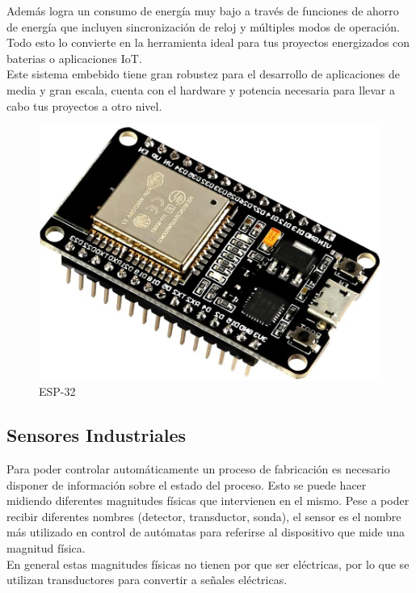 \documentclass[12pt,titlepage]{article}
\begin{document}
Además  logra un consumo de energía muy bajo a través de funciones de ahorro de energía que incluyen sincronización de reloj y múltiples modos de operación. Todo esto lo convierte en la herramienta ideal para tus proyectos energizados con baterias o aplicaciones IoT. \\[0.8em]

Este sistema embebido tiene gran robustez para el desarrollo de aplicaciones de media y  gran escala, cuenta con el hardware y potencia necesaria para llevar a cabo tus proyectos a otro nivel. \\[0.8mm] 

\begin{figure}[htbp]
\hspace*{5.5cm} 
\includegraphics[scale=0.20]{ESP-32}
\caption{ESP-32}
\end{figure}

\newpage
\subsection{Sensores Industriales}
Para poder controlar automáticamente un proceso de fabricación es necesario disponer de información sobre el estado del proceso. Esto se puede hacer midiendo diferentes magnitudes físicas que intervienen en el mismo. Pese a poder recibir diferentes nombres (detector, transductor, sonda), el sensor es el nombre más utilizado en control de autómatas para referirse al dispositivo que mide una magnitud física. \\

En general estas magnitudes físicas no tienen por que ser eléctricas, por lo que se utilizan transductores para convertir a señales eléctricas. \\[0.8mm]
\end{document}
